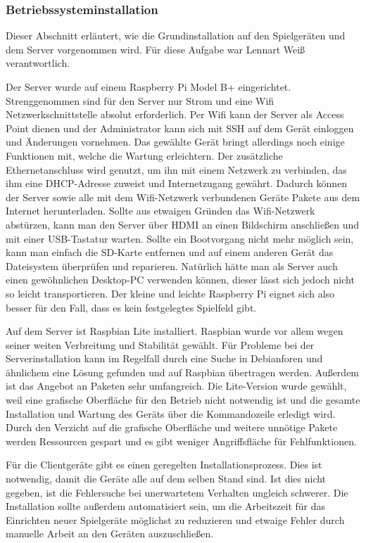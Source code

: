 \subsubsection{Betriebssysteminstallation}

Dieser Abschnitt erläutert, wie die Grundinstallation auf den Spielgeräten und dem Server
vorgenommen wird.
Für diese Aufgabe war Lennart Weiß verantwortlich.

Der Server wurde auf einem Raspberry Pi Model B+ eingerichtet. Strenggenommen
sind für den Server nur Strom und eine Wifi Netzwerkschnittstelle absolut erforderlich. Per
Wifi kann der Server als Access Point dienen und der Administrator kann sich mit
SSH auf dem Gerät einloggen und Änderungen vornehmen. Das gewählte Gerät bringt
allerdings noch einige Funktionen mit, welche die Wartung erleichtern. Der
zusätzliche Ethernetanschluss wird genutzt, um ihn mit einem Netzwerk zu
verbinden, das ihm eine DHCP-Adresse zuweist und Internetzugang gewährt. 
Dadurch können der Server sowie alle mit dem Wifi-Netzwerk verbundenen Geräte
Pakete aus dem Internet herunterladen. Sollte aus etwaigen Gründen das Wifi-Netzwerk
abstürzen, kann man den Server über HDMI an einen Bildschirm
anschließen und mit einer USB-Tastatur warten. Sollte ein Bootvorgang nicht
mehr möglich sein, kann man einfach die SD-Karte entfernen und auf einem anderen
Gerät das Dateisystem überprüfen und reparieren. Natürlich hätte man als Server
auch einen gewöhnlichen Desktop-PC verwenden können, dieser lässt sich jedoch
nicht so leicht transportieren. Der kleine und leichte Raspberry Pi eignet sich
also besser für den Fall, dass es kein festgelegtes Spielfeld gibt.

Auf dem Server ist Raspbian Lite installiert. Raspbian wurde vor allem wegen 
seiner weiten Verbreitung und Stabilität gewählt. Für Probleme bei der 
Serverinstallation kann im Regelfall durch eine Suche in Debianforen und ähnlichem
eine Lösung gefunden und auf Raspbian übertragen werden. Außerdem ist das
Angebot an Paketen sehr umfangreich. Die Lite-Version wurde gewählt, weil eine
grafische Oberfläche für den Betrieb nicht notwendig ist und die gesamte
Installation und Wartung des Geräts über die Kommandozeile erledigt wird.
Durch den Verzicht auf die grafische Oberfläche und weitere unnötige Pakete
werden Ressourcen gespart und es gibt weniger Angriffsfläche für Fehlfunktionen.

Für die Clientgeräte gibt es einen geregelten Installationsprozess. Dies ist
notwendig, damit die Geräte alle auf dem selben Stand sind. Ist dies nicht
gegeben, ist die Fehlersuche bei unerwartetem Verhalten ungleich schwerer. Die
Installation sollte außerdem automatisiert sein, um die Arbeitszeit für das
Einrichten neuer Spielgeräte möglichst zu reduzieren und etwaige Fehler durch
manuelle Arbeit an den Geräten auszuschließen.

